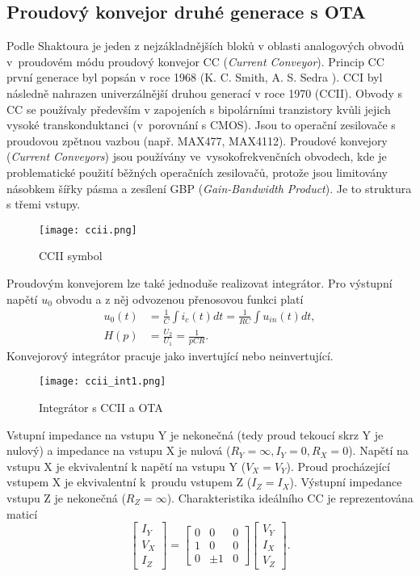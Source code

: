 \subsection{Proudový konvejor druhé generace s OTA}
Podle Shaktoura \cite{15} je jeden z nejzákladnějších bloků v oblasti analogových obvodů v~proudovém módu proudový konvejor CC (\textit{Current Conveyor}). Princip CC první generace byl popsán v roce 1968 (K. C. Smith, A. S. Sedra \cite{16}). CCI byl následně nahrazen univerzálnější druhou generací v roce 1970 (CCII)\cite{17}. Obvody s CC se používaly především v zapojeních s bipolárními tranzistory kvůli jejich vysoké transkonduktanci (v~porovnání s CMOS). Jsou to operační zesilovače s proudovou zpětnou vazbou (např. MAX477, MAX4112). Proudové konvejory (\textit{Current Conveyors}) jsou používány ve~vysokofrekvenčních obvodech, kde je problematické použití běžných operačních zesilovačů, protože jsou limitovány násobkem šířky pásma a zesílení GBP (\textit{Gain-Bandwidth Product}). Je to struktura s třemi vstupy.
\begin{figure}[h]
\centering
\texttt{[image: ccii.png]}
\caption[CCII symbol]{CCII symbol \cite{15}}
\end{figure}
\noindent Proudovým konvejorem lze také jednoduše realizovat integrátor. Pro výstupní napětí $u_0$ obvodu a z něj odvozenou přenosovou funkci platí
\begin{align}
u_0(t) &= \frac{1}{C}\int i_c(t)dt = \frac{1}{RC}\int u_{in}(t)dt, \\
H(p) &= \frac{U_2}{U_1} = \frac{1}{pCR}.
\end{align}
\noindent Konvejorový integrátor pracuje jako invertující nebo neinvertující.
\begin{figure}[h]
\centering
\texttt{[image: ccii\_int1.png]}
\caption[Integrátor s CCII a OTA]{Integrátor s CCII a OTA \cite{12}}
\end{figure}
\noindent Vstupní impedance na vstupu Y je nekonečná (tedy proud tekoucí skrz Y je nulový) a impedance na vstupu X je nulová ($R_Y = \infty, I_Y = 0, R_X = 0$). Napětí na vstupu X je ekvivalentní k napětí na vstupu Y ($V_X = V_Y$). Proud procházející vstupem X je ekvivalentní k~proudu vstupem Z ($I_Z = I_X$). Výstupní impedance vstupu Z je nekonečná ($R_Z = \infty$).
Charakteristika ideálního CC je reprezentována maticí
\begin{equation}
\begin{bmatrix}
I_Y \\ V_X \\ I_Z
\end{bmatrix}
=
\begin{bmatrix}
0 & 0 & 0 \\
1 & 0 & 0 \\
0 & \pm 1 & 0 
\end{bmatrix}
\begin{bmatrix}
V_Y \\
I_X \\
V_Z
\end{bmatrix}.
\end{equation}
